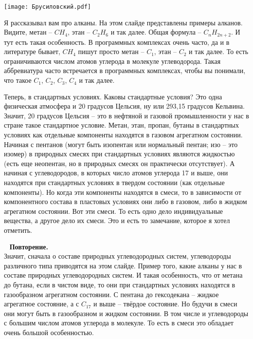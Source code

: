 \documentclass[main.tex]{subfiles}
\begin{document}
\begin{center}
\texttt{[image: Брусиловский.pdf]}
\end{center}

Я рассказывал вам про алканы.
На этом слайде представлены примеры алканов.
Видите, метан -- $CH_4$, этан -- $C_2H_6$ и так далее.
Общая формула -- $C_nH_{2n+2}$.
И тут есть такая особенность.
В программных комплексах очень часто, да и в литературе бывает, $CH_4$ пишут просто метан -- $C_1$, этан -- $C_2$ и так далее.
То есть ограничиваются числом атомов углерода в молекуле углеводорода.
Такая аббревиатура часто встречается в программных комплексах, чтобы вы понимали, что такое $C_1$, $C_2$, $C_3$, $C_4$ и так далее.

Теперь, в стандартных условиях. Каковы стандартные условия?
Это одна физическая атмосфера и 20 градусов Цельсия, ну или 293,15 градусов Кельвина.
Значит, 20 градусов Цельсия -- это в нефтяной и газовой промышленности у нас в стране такое стандартное условие.
Метан, этан, пропан, бутаны в стандартных условиях как отдельные компоненты находятся в газовом агрегатном состоянии.
Начиная с пентанов (могут быть изопентан или нормальный пентан; изо -- это изомер) в природных смесях при стандартных условиях являются жидкостью (есть еще неопентан, но в природных смесях он практически отсутствует).
А начиная с углеводородов, в которых число атомов углерода 17 и выше, они находятся при стандартных условиях в твердом состоянии (как отдельные компоненты).
Но когда эти компоненты находятся в смеси, то в зависимости от компонентного состава в пластовых условиях они либо в газовом, либо в жидком агрегатном состоянии.
Вот эти смеси.
То есть одно дело индивидуальные вещества, а другое дело их смеси.
Это и есть то замечание, которое я хотел отметить.

\ \newline
\textbf{Повторение.}\\
Значит, сначала о составе природных углеводородных систем, углеводороды различного типа приводятся на этом слайде.
Пример того, какие алканы у нас в составе природных углеводородных систем.
И такая особенность, что от метана до бутана, если в чистом виде, то они при стандартных условиях находятся в газообразном агрегатном состоянии.
С пентана до гексодекана -- жидкое агрегатное состояние, а с $C_{17}$ и выше -- твёрдое состояние.
Но будучи в смеси они могут быть в газообразном и жидком состоянии.
В том числе и углеводороды с большим числом атомов углерода в молекуле.
То есть в смеси это обладает очень большой особенностью.
\end{document}
